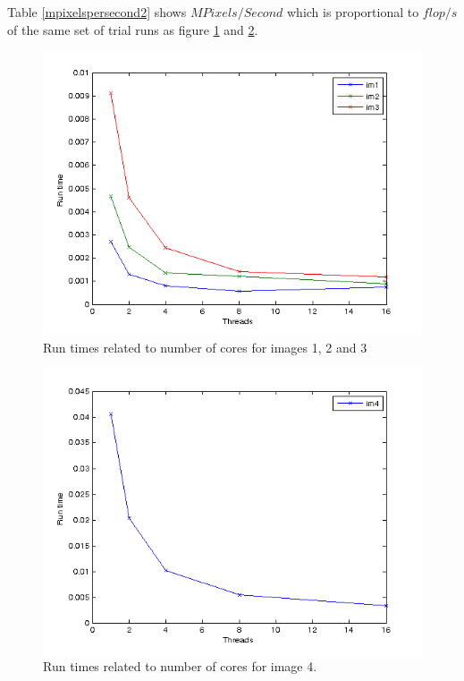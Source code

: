\documentclass[a4paper,11pt]{article}
\begin{document}
Table \ref{mpixelspersecond2} shows $MPixels/Second$ which is proportional to $flop/s$ of the same set of trial runs as figure \ref{thresc_123} and \ref{thresc_4}.

\begin{figure}[!h]
  \caption{Run times related to number of cores for images 1, 2 and 3}
  \label{thresc_123}
  \includegraphics[scale=0.9]{../plots/pthread_im123.png}
\end{figure}
\begin{figure}[!h]
  \caption{Run times related to number of cores for image 4.}
  \label{thresc_4}
  \includegraphics[scale=0.9]{../plots/pthread_im4.png}
\end{figure}
\end{document}
